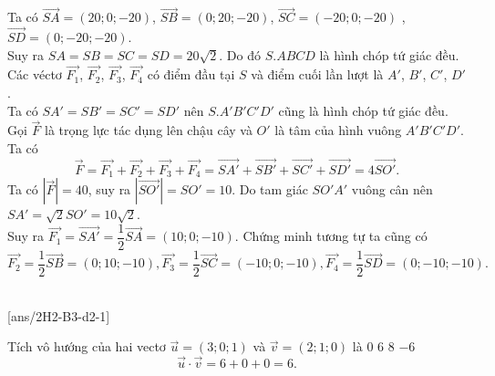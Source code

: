 \begin{vd}
{\begin{center}
		\end{center}
		Ta có $\overrightarrow{SA} = (20; 0; -20)$, $\overrightarrow{SB} = (0; 20; -20)$, $\overrightarrow{SC} = (-20; 0; -20)$ , $\overrightarrow{SD} = (0; -20; -20)$.\\
		Suy ra $SA = SB = SC = SD = 20\sqrt{2}$. Do đó $S.ABCD$ là hình chóp tứ giác đều.
		Các véctơ $\overrightarrow{F_1}$, $\overrightarrow{F_2}$, $\overrightarrow{F_3}$, $\overrightarrow{F_4}$ có điểm đầu tại $S$ và điểm cuối lần lượt là $A'$, $B'$, $C'$, $D'$.\\
		Ta có $SA' = SB' = SC' = SD'$ nên $S.A'B'C'D'$ cũng là hình chóp tứ giác đều.\\
		Gọi $\overrightarrow{F} $ là trọng lực tác dụng lên chậu cây và $O'$ là tâm của hình vuông $A'B'C'D'$. Ta có
		\[ \overrightarrow{F} =\overrightarrow{F_1} + \overrightarrow{F_2}+ \overrightarrow{F_3}+ \overrightarrow{F_4} = \overrightarrow{SA'} + \overrightarrow{SB'}+ \overrightarrow{SC'}+ \overrightarrow{SD'} = 4\overrightarrow{SO'}.\]
		Ta có $\left| \overrightarrow{F} \right| =40$, suy ra $\left| \overrightarrow{SO'} \right| = SO' = 10$.
		Do tam giác $SO'A'$ vuông cân nên $SA' = \sqrt{2}SO' = 10\sqrt{2}$.\\
		Suy ra $\overrightarrow{F_1} = \overrightarrow{SA'} = \dfrac{1}{2}\overrightarrow{SA}  = (10; 0; -10)$.
		Chứng minh tương tự ta cũng có\\
		\[ \overrightarrow{F_2} = \dfrac{1}{2}\overrightarrow{SB}  = (0; 10; -10), \overrightarrow{F_3} = \dfrac{1}{2}\overrightarrow{SC}  = (-10; 0; -10), \overrightarrow{F_4} = \dfrac{1}{2}\overrightarrow{SD}  = (0; -10; -10). \]
	}
\end{vd}
 \\
\setcounter{ex}{0}
[ans/2H2-B3-d2-1]

\begin{ex}
	Tích vô hướng của hai vectơ $\vec{u}=(3;0;1)$ và $\vec{v}=(2;1;0)$ là
	\choice
	{$0$}
	{\True$6$}
	{$8$}
	{$-6$}
	\loigiai
	{
		$$\vec{u}\cdot\vec{v}=6+0+0=6.$$
	}
\end{ex} 

